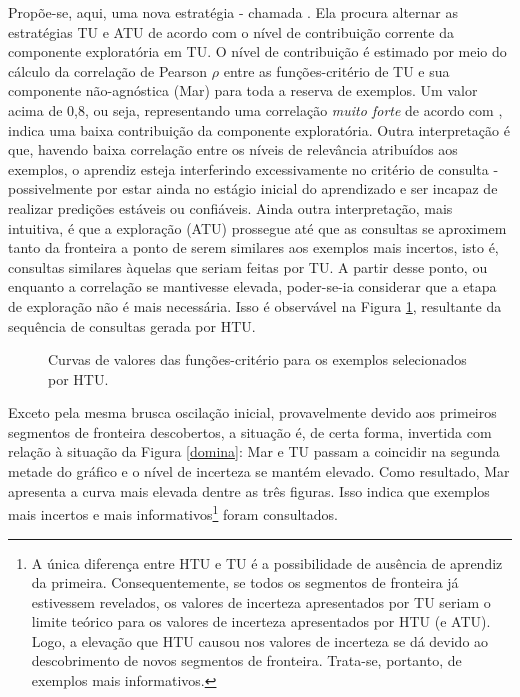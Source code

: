 Propõe-se, aqui, uma nova estratégia \cite{bracis15} - chamada .
Ela procura alternar as estratégias TU e ATU de acordo com o nível de contribuição corrente da componente exploratória em TU.
O nível de contribuição é estimado por meio do cálculo da correlação de Pearson $\rho$ \cite{books/daglib/0000786} entre as funções-critério de TU e sua componente não-agnóstica (Mar) para toda a reserva de exemplos.
Um valor acima de 0,8, ou seja, representando uma correlação \textit{muito forte} de acordo com , indica uma baixa contribuição da componente exploratória.
Outra interpretação é que, havendo baixa correlação entre os níveis de relevância atribuídos aos exemplos, o aprendiz esteja interferindo excessivamente no critério de consulta - possivelmente por estar ainda no estágio inicial do aprendizado e ser incapaz de realizar predições estáveis ou confiáveis.
Ainda outra interpretação, mais intuitiva, é que a exploração (ATU) prossegue até que as consultas se aproximem tanto da fronteira a ponto de serem similares aos exemplos mais incertos, isto é, consultas similares àquelas que seriam feitas por TU.
A partir desse ponto, ou enquanto a correlação se mantivesse elevada, poder-se-ia considerar que a etapa de exploração não é mais necessária.
Isso é observável na Figura \ref{domina3}, resultante da sequência de consultas gerada por HTU.
\begin{figure}
	\centering
	
	\caption[Curvas das funções-critério para os exemplos selecionados por HTU.]{Curvas de valores das funções-critério para os exemplos selecionados por HTU.}
	\label{domina3}
\end{figure}
Exceto pela mesma brusca oscilação inicial, provavelmente devido aos primeiros segmentos de fronteira descobertos, a situação é, de certa forma, invertida com relação à situação da Figura \ref{domina}: Mar e TU passam a coincidir na segunda metade do gráfico e o nível de incerteza se mantém elevado.
Como resultado, Mar apresenta a curva mais elevada dentre as três figuras.
Isso indica que exemplos mais incertos e mais informativos\footnote{A única diferença entre HTU e TU é a possibilidade de ausência de aprendiz da primeira.
Consequentemente, se todos os segmentos de fronteira já estivessem revelados, os valores de incerteza apresentados por TU seriam o limite teórico para os valores de incerteza apresentados por HTU (e ATU).
Logo, a elevação que HTU causou nos valores de incerteza se dá devido ao descobrimento de novos segmentos de fronteira.
Trata-se, portanto, de exemplos mais informativos.} foram consultados.

